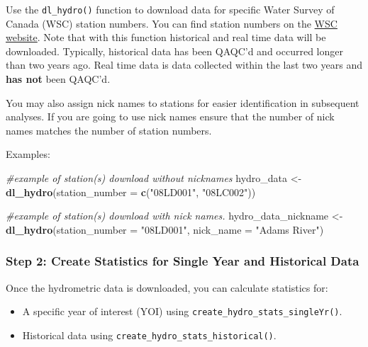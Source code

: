 \documentclass[
]{article}
\newenvironment{Shaded}{\begin{snugshade}}{\end{snugshade}}
\newcommand{\AttributeTok}[1]{\textcolor[rgb]{0.13,0.29,0.53}{#1}}
\newcommand{\CommentTok}[1]{\textcolor[rgb]{0.56,0.35,0.01}{\textit{#1}}}
\newcommand{\FunctionTok}[1]{\textcolor[rgb]{0.13,0.29,0.53}{\textbf{#1}}}
\newcommand{\NormalTok}[1]{#1}
\newcommand{\OtherTok}[1]{\textcolor[rgb]{0.56,0.35,0.01}{#1}}
\newcommand{\StringTok}[1]{\textcolor[rgb]{0.31,0.60,0.02}{#1}}
\providecommand{\tightlist}{%
  \setlength{\itemsep}{0pt}\setlength{\parskip}{0pt}}
\begin{document}
Use the \texttt{dl\_hydro()} function to download data for specific
Water Survey of Canada (WSC) station numbers. You can find station
numbers on the
\href{https://wateroffice.ec.gc.ca/search/real_time_e.html}{WSC
website}. Note that with this function historical and real time data
will be downloaded. Typically, historical data has been QAQC'd and
occurred longer than two years ago. Real time data is data collected
within the last two years and \textbf{has not} been QAQC'd.~

You may also assign nick names to stations for easier identification in
subsequent analyses. If you are going to use nick names ensure that the
number of nick names matches the number of station numbers.

Examples:

\begin{Shaded}
\begin{Highlighting}[]
\CommentTok{\#example of station(s) download without nicknames}
\NormalTok{hydro\_data }\OtherTok{\textless{}{-}} \FunctionTok{dl\_hydro}\NormalTok{(}\AttributeTok{station\_number =} \FunctionTok{c}\NormalTok{(}\StringTok{"08LD001"}\NormalTok{, }\StringTok{"08LC002"}\NormalTok{))}

\CommentTok{\#example of station(s) download with nick names. }
\NormalTok{hydro\_data\_nickname }\OtherTok{\textless{}{-}} \FunctionTok{dl\_hydro}\NormalTok{(}\AttributeTok{station\_number =} \StringTok{"08LD001"}\NormalTok{, }\AttributeTok{nick\_name =} \StringTok{"Adams River"}\NormalTok{)}
\end{Highlighting}
\end{Shaded}

\hypertarget{step-2-create-statistics-for-single-year-and-historical-data}{%
\subsubsection{Step 2: Create Statistics for Single Year and Historical
Data}\label{step-2-create-statistics-for-single-year-and-historical-data}}

Once the hydrometric data is downloaded, you can calculate statistics
for:

\begin{itemize}
\tightlist
\item
  A specific year of interest (YOI) using
  \texttt{create\_hydro\_stats\_singleYr()}.
\item
  Historical data using \texttt{create\_hydro\_stats\_historical()}.
\end{itemize}
\end{document}
